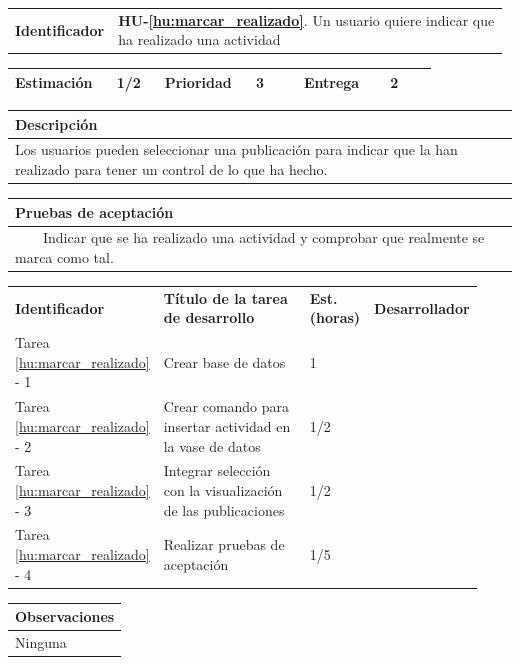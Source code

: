 \documentclass[11pt]{article}
\newcommand{\tabitem}{~~\llap{\textbullet}~~}
\begin{document}
\begin{longtable}{p{0.18\linewidth}|p{0.8\linewidth}}
  \rowcolor{LightCyan}
  \textbf{Identificador} & \textbf{{HU-\ref{hu:marcar_realizado}}}. Un usuario quiere indicar que ha realizado una actividad \\  
\end{longtable}
\vspace{-0.8cm}
\begin{longtable}{p{0.18\linewidth}|p{0.1\linewidth}|p{0.18\linewidth}|p{0.1\linewidth}|p{0.18\linewidth}|p{0.1\linewidth}}
	\toprule
	\textbf{Estimación} & 1/2 & \textbf{Prioridad} & 3 & \textbf{Entrega} & 2 \\
	\bottomrule
\end{longtable}
\vspace{-0.8cm}
\begin{longtable}{p{1.028\linewidth}}
	\textbf{Descripción}\\
	\midrule
	Los usuarios pueden seleccionar una publicación para indicar que la han realizado para tener un control de lo que ha hecho. \\
	\bottomrule
\end{longtable}
\vspace{-0.8cm}
\begin{longtable}{p{1.028\linewidth}}
	\textbf{Pruebas de aceptación}\\
	\midrule
	\tabitem Indicar que se ha realizado una actividad y comprobar que realmente se marca como tal.\\

\end{longtable}
\vspace{-0.8cm}
\begin{longtable}{p{0.18\linewidth}|p{0.48\linewidth}|p{0.1\linewidth}|p{0.17\linewidth}}
  \toprule
  \textbf{Identificador} & \textbf{Título de la tarea de desarrollo} & \textbf{Est. (horas)} & \textbf{Desarrollador} \\
  Tarea \ref{hu:marcar_realizado} - 1 & Crear base de datos & 1 &\\
  Tarea \ref{hu:marcar_realizado} - 2 & Crear comando para insertar actividad en la vase de datos & 1/2 & \\
  Tarea \ref{hu:marcar_realizado} - 3 & Integrar selección con la visualización de las publicaciones & 1/2 & \\
  Tarea \ref{hu:marcar_realizado} - 4 & Realizar pruebas de aceptación & 1/5 &  \\
  \bottomrule
\end{longtable}
\vspace{-0.8cm}
\begin{longtable}{p{1.028\linewidth}}
  \textbf{Observaciones}\\
  \midrule
  Ninguna\\
  \bottomrule
\end{longtable}
\end{document}
